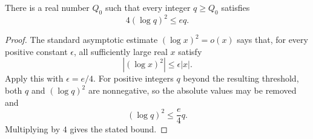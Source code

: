 \begin{helper}
There is a real number \(Q_0\) such that every integer \(q\ge Q_0\) satisfies
\[
  4(\log q)^2\le e q.
\]
\end{helper}
\begin{proof}
The standard asymptotic estimate \((\log x)^2=o(x)\) says that, for every
positive constant \(\epsilon\), all sufficiently large real \(x\) satisfy
\[
  |(\log x)^2|\le \epsilon |x|.
\]
Apply this with \(\epsilon=e/4\).  For positive integers \(q\) beyond the
resulting threshold, both \(q\) and \((\log q)^2\) are nonnegative, so the
absolute values may be removed and
\[
  (\log q)^2\le \frac e4 q.
\]
Multiplying by \(4\) gives the stated bound.
\end{proof}


